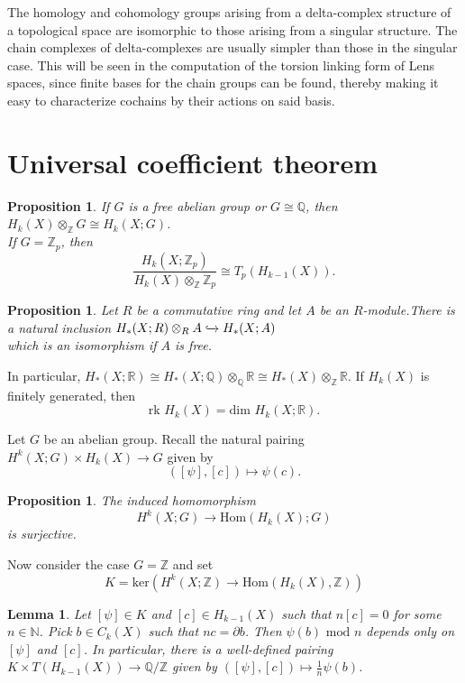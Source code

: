 \documentclass{article}
\newtheorem{lemma}[theorem]{Lemma}
\newtheorem{proposition}[theorem]{Proposition}
\begin{document}
The homology and cohomology groups arising from a delta-complex structure of a topological space are isomorphic to those arising from a singular structure. The chain complexes of delta-complexes are usually simpler than those in the singular case. This will be seen in the computation of the torsion linking form of Lens spaces, since finite bases for the chain groups can be found, thereby making it easy to characterize cochains by their actions on said basis.

\section{Universal coefficient theorem}
\begin{proposition}
If $G$ is a free abelian group or $G\cong\mathbb{Q}$, then $H_k(X)\otimes_\mathbb{Z}G\cong H_k(X;G)$.\\
If $G=\mathbb{Z}_p$, then \[\frac{H_k(X;\mathbb{Z}_p)}{H_k(X)\otimes_\mathbb{Z}\mathbb{Z}_p}\cong T_p(H_{k-1}(X)).\]
\end{proposition}

\begin{proposition}
Let $R$ be a commutative ring and let $A$ be an $R$-module.There is a natural inclusion $H_*(X;R)\otimes_RA\xhookrightarrow{}H_*(X;A)$\\
which is an isomorphism if $A$ is free.
\end{proposition}

In particular, $H_*(X;\mathbb{R})\cong H_*(X;\mathbb{Q})\otimes_\mathbb{Q}\mathbb{R}\cong H_*(X)\otimes_\mathbb{Z}\mathbb{R}$. If $H_k(X)$ is finitely generated, then \[\text{rk }H_k(X)=\text{dim }H_k(X;\mathbb{R}).\]

Let $G$ be an abelian group. Recall the natural pairing $H^k(X;G)\times H_k(X)\to G$ given by \[([\psi],[c])\mapsto\psi(c).\]

\begin{proposition}
The induced homomorphism \[H^k(X;G)\to\text{Hom}(H_k(X);G)\]is surjective.
\end{proposition}
Now consider the case $G=\mathbb{Z}$ and set\[K=\text{ker}(H^k(X;\mathbb{Z})\to\text{Hom}(H_k(X),\mathbb{Z}))\]
\begin{lemma}
Let $[\psi]\in K$ and $[c]\in H_{k-1}(X)$ such that $n[c]=0$ for some $n\in\mathbb{N}$. Pick $b\in C_k(X)$ such that $nc=\partial b$. Then $\psi(b)\text{ mod }n$ depends only on $[\psi]$ and $[c]$.
In particular, there is a well-defined pairing $K\times T(H_{k-1}(X))\to\mathbb{Q}/\mathbb{Z}$ given by $([\psi],[c])\mapsto\frac{1}{n}\psi(b)$.
\end{lemma}
\end{document}
